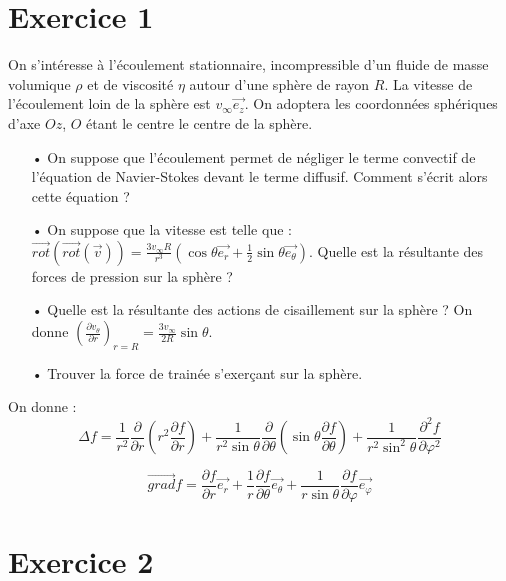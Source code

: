 \documentclass{report}
\begin{document}
\section*{Exercice 1}

On s'intéresse à l'écoulement stationnaire, incompressible d'un fluide de masse volumique $\rho$ et de viscosité $\eta$ autour d'une sphère de rayon $R$. La vitesse de l'écoulement loin de la sphère est $v_\infty\vec{e_z}$. On adoptera les coordonnées sphériques d'axe $Oz$, $O$ étant le centre le centre de la sphère. 

\begin{itemize}
	\item[•] On suppose que l'écoulement permet de négliger le terme convectif de l'équation de Navier-Stokes devant le terme diffusif. Comment s'écrit alors cette équation ? 
	\item[•] On suppose que la vitesse est telle que : $\vec{rot}(\vec{rot}(\vec{v}))=\frac{3v_\infty R}{r^3}\left(\cos\theta\vec{e_r}+\frac{1}{2}\sin\theta\vec{e_\theta} \right) $. Quelle est la résultante des forces de pression sur la sphère ? 
	\item[•] Quelle est la résultante des actions de cisaillement sur la sphère ? On donne $\left(\frac{\partial v_\theta}{\partial r}\right)_{r=R}=\frac{3v_\infty}{2R}\sin\theta  $.
	\item[•] Trouver la force de trainée s'exerçant sur la sphère. 
\end{itemize}

On donne : 
\begin{equation}
	\Delta f = \frac{1}{r^2}\frac{\partial}{\partial r} \left(r^2\frac{\partial f}{\partial r} \right) + \frac{1}{r^2\sin\theta}\frac{\partial}{\partial \theta} \left(\sin\theta\frac{\partial f}{\partial \theta} \right) + \frac{1}{r^2\sin^2\theta}\frac{\partial^2 f}{\partial \varphi^2} 
\end{equation}

\begin{equation}
	\vec{grad} f = \frac{\partial f}{\partial r} \vec{e_r} + \frac{1}{r}\frac{\partial f}{\partial \theta}\vec{e_\theta} + \frac{1}{r\sin\theta}\frac{\partial f}{\partial \varphi}\vec{e_\varphi}
\end{equation}

\newpage

\section*{Exercice 2}
\end{document}
